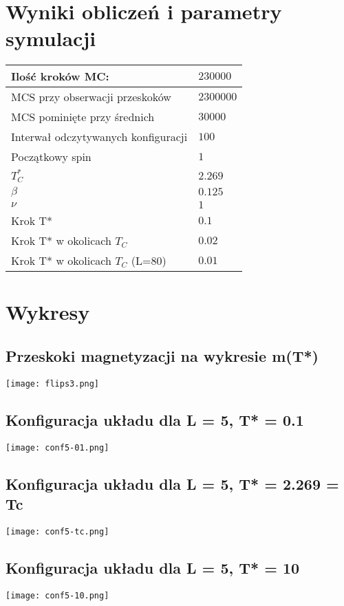 \documentclass{article}
\begin{document}
\newpage
\section{Wyniki obliczeń i parametry symulacji}
\begin{center}
\begin{tabular}{p{5cm}|p{5cm}}
	Ilość kroków MC: & $230 000$\\
	\hline
	MCS przy obserwacji przeskoków & $2 300 000$\\
	\hline
	MCS pominięte przy średnich & $30 000$\\
	\hline
	Interwał odczytywanych konfiguracji& $100$\\
	\hline
	Początkowy spin & $1$\\
	\hline
	$T^*_C$ & $2.269$\\
	\hline
	$\beta$ & $0.125$\\
	\hline
	$\nu$ & $1$\\
	\hline
	Krok T* & $0.1$\\
	\hline
	Krok T* w okolicach $T_C$ & $0.02$\\
	\hline
	Krok T* w okolicach $T_C$ (L=80)& $0.01$\\
\end{tabular}
\end{center}

\section{Wykresy}
\subsection{Przeskoki magnetyzacji na wykresie m(T*)}
\texttt{[image: flips3.png]}

\subsection{Konfiguracja układu dla L = 5, T* = 0.1}
\texttt{[image: conf5-01.png]}
\subsection{Konfiguracja układu dla L = 5, T* = 2.269 = Tc}
\texttt{[image: conf5-tc.png]}
\subsection{Konfiguracja układu dla L = 5, T* = 10}
\texttt{[image: conf5-10.png]}
\end{document}

